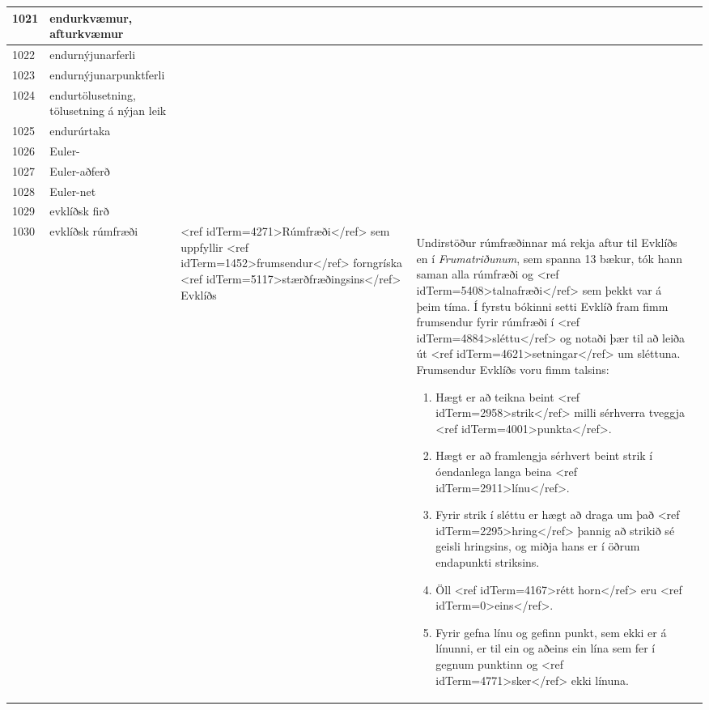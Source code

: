 \begin{longtable}{p{}|p{}|p{}|p{}|p{}}
\hline
1021 & endurkvæmur, afturkvæmur &  &  &  \\
\hline
1022 & endurnýjunarferli &  &  &  \\
\hline
1023 & endurnýjunarpunktferli &  &  &  \\
\hline
1024 & endurtölusetning, tölusetning á nýjan leik &  &  &  \\
\hline
1025 & endurúrtaka &  &  &  \\
\hline
1026 & Euler- &  &  &  \\
\hline
1027 & Euler-aðferð &  &  &  \\
\hline
1028 & Euler-net &  &  &  \\
\hline
1029 & evklíðsk firð &  &  &  \\
\hline
1030 & evklíðsk rúmfræði & <ref idTerm=4271>Rúmfræði</ref> sem uppfyllir <ref idTerm=1452>frumsendur</ref> forngríska <ref idTerm=5117>stærðfræðingsins</ref> Evklíðs & Undirstöður rúmfræðinnar má rekja aftur til Evklíðs en í \textit{Frumatriðunum}, sem spanna 13 bækur, tók hann saman alla rúmfræði og <ref idTerm=5408>talnafræði</ref> sem þekkt var á þeim tíma. Í fyrstu bókinni setti Evklíð fram fimm frumsendur fyrir rúmfræði í <ref idTerm=4884>sléttu</ref> og notaði þær til að leiða út <ref idTerm=4621>setningar</ref> um sléttuna. Frumsendur Evklíðs voru fimm talsins:

\begin{enumerate}
    \item Hægt er að teikna beint <ref idTerm=2958>strik</ref> milli sérhverra tveggja <ref idTerm=4001>punkta</ref>.
    
    \item Hægt er að framlengja sérhvert beint strik í óendanlega langa beina <ref idTerm=2911>línu</ref>.

    \item Fyrir strik í sléttu er hægt að draga um það <ref idTerm=2295>hring</ref> þannig að strikið sé geisli hringsins, og miðja hans er í öðrum endapunkti striksins.

    \item Öll <ref idTerm=4167>rétt horn</ref> eru <ref idTerm=0>eins</ref>.

    \item Fyrir gefna línu og gefinn punkt, sem ekki er á línunni, er til ein og aðeins ein lína sem fer í gegnum punktinn og <ref idTerm=4771>sker</ref> ekki línuna.
\end{enumerate}


\end{longtable}
